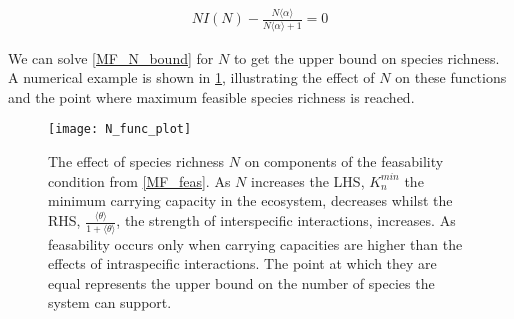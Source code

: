 \documentclass{article}
\begin{document}
\begin{align}
  N I(N) - \frac{N \langle \alpha \rangle}{N \langle \alpha \rangle + 1} = 0 \label{MF_N_bound}
\end{align}

We can solve \cref{MF_N_bound} for $N$ to get the upper bound on species richness. A numerical example is shown in \cref{N_func_plot}, illustrating the effect of $N$ on these functions and the point where maximum feasible species richness is reached.

\begin{figure}
  \texttt{[image: N\_func\_plot]}
  \centering
  \caption{The effect of species richness $N$ on components of the feasability condition from \cref{MF_feas}. As $N$ increases the LHS, $K_n^{min}$ the minimum carrying capacity in the ecosystem, decreases whilst the RHS, $\frac{\langle \theta \rangle}{1 + \langle \theta \rangle}$, the strength of interspecific interactions, increases. As feasability occurs only when carrying capacities are higher than the effects of intraspecific interactions. The point at which they are equal represents the upper bound on the number of species the system can support.}
  \label{N_func_plot}
\end{figure}
\end{document}
